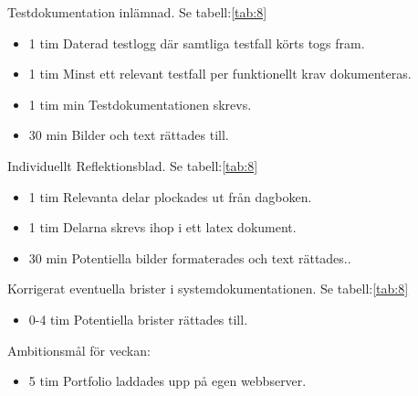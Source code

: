 \documentclass{TDP003mall}
\begin{document}
Testdokumentation inlämnad. Se tabell:\ref{tab:8}
\begin{itemize}
  \item 1 tim Daterad testlogg där samtliga testfall körts togs fram.
  \item 1 tim Minst ett relevant testfall per funktionellt krav dokumenteras.
  \item 1 tim min Testdokumentationen skrevs.
  \item 30 min Bilder och text rättades till.
\end{itemize}

Individuellt Reflektionsblad. Se tabell:\ref{tab:8}
\begin{itemize}
\item 1 tim Relevanta delar plockades ut från dagboken.
  \item 1 tim Delarna skrevs ihop i ett latex dokument.
  \item 30 min Potentiella bilder formaterades och text rättades..
\end{itemize}
  
  Korrigerat eventuella brister i systemdokumentationen. Se tabell:\ref{tab:8}
\begin{itemize}
  \item 0-4 tim Potentiella brister rättades till.
\end{itemize}

Ambitionsmål för veckan:
\begin{itemize}
  \item 5 tim Portfolio laddades upp på egen webbserver.
\end{itemize}
\end{document}
